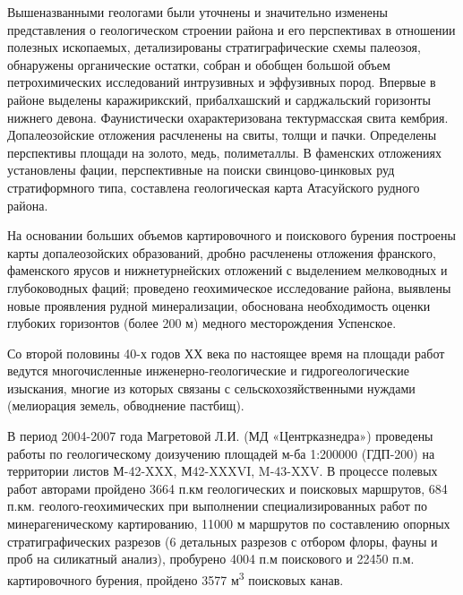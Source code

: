\begin{multicols}{2}
Вышеназванными геологами были уточнены и значительно изменены
представления о геологическом строении района и его перспективах в
отношении полезных ископаемых, детализированы стратиграфические схемы
палеозоя, обнаружены органические остатки, собран и обобщен большой
объем петрохимических исследований интрузивных и эффузивных пород.
Впервые в районе выделены каражирикский, прибалхашский и сарджальский
горизонты нижнего девона. Фаунистически охарактеризована тектурмасская
свита кембрия. Допалеозойские отложения расчленены на свиты, толщи и
пачки. Определены перспективы площади на золото, медь, полиметаллы. В
фаменских отложениях установлены фации, перспективные на поиски
свинцово-цинковых руд стратиформного типа, составлена геологическая
карта Атасуйского рудного района.

На основании больших объемов картировочного и поискового бурения
построены карты допалеозойских образований, дробно расчленены отложения
франского, фаменского ярусов и нижнетурнейских отложений с выделением
мелководных и глубоководных фаций; проведено геохимическое исследование
района, выявлены новые проявления рудной минерализации, обоснована
необходимость оценки глубоких горизонтов (более 200 м) медного
месторождения Успенское.

Со второй половины 40-х годов ХХ века по настоящее время на площади
работ ведутся многочисленные инженерно-геологические и
гидрогеологические изыскания, многие из которых связаны с
сельскохозяйственными нуждами (мелиорация земель, обводнение пастбищ).

В период 2004-2007 года Магретовой Л.И. (МД «Центрказнедра») проведены
работы по геологическому доизучению площадей м-ба 1:200000 (ГДП-200) на
территории листов М-42-XXX, М42-XXXVI, M-43-XXV. В процессе полевых
работ авторами пройдено 3664 п.км геологических и поисковых маршрутов,
684 п.км. геолого-геохимических при выполнении специализированных работ
по минерагеническому картированию, 11000 м маршрутов по составлению
опорных стратиграфических разрезов (6 детальных разрезов с отбором
флоры, фауны и проб на силикатный анализ), пробурено 4004 п.м поискового
и 22450 п.м. картировочного бурения, пройдено 3577 м\textsuperscript{3}
поисковых канав.


\end{multicols}

